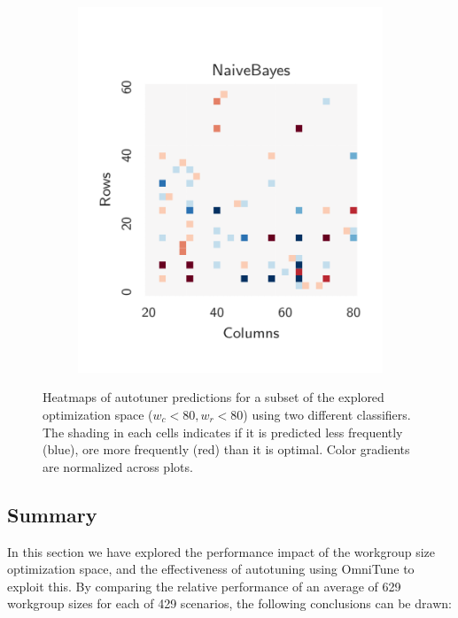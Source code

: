 \documentclass[nonatbib,preprint,nocopyrightspace,9pt]{sigplanconf}
\begin{document}
\begin{figure}
\begin{subfigure}[t]{0.48\columnwidth}
      \includegraphics[width=\columnwidth]{img/heatmap_2}
      \vspace{-1.5em} %
      \caption{}
      \label{fig:class-hmaps-2}
    \end{subfigure}
    \vspace{-.5em}
    \caption{%
    Heatmaps of autotuner predictions for a subset of the explored optimization
    space ($w_c < 80, w_r < 80$) using two different classifiers. The shading in
    each cells indicates if it is predicted less frequently (blue), ore more
    frequently (red) than it is optimal. Color gradients are normalized across
    plots.
    \vspace{-1.5em}%
    }
    \label{fig:class-hmaps}
  \end{figure}


  \subsection{Summary}

  In this section we have explored the performance impact of the workgroup size
  optimization space, and the effectiveness of autotuning using OmniTune to
  exploit this. By comparing the relative performance of an average of 629
  workgroup sizes for each of 429 scenarios, the following conclusions can be
  drawn:
\end{document}
